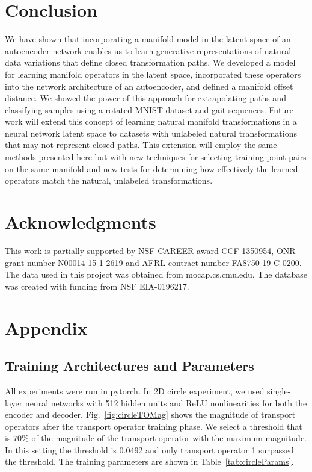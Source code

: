 \documentclass[letterpaper]{article} %
\begin{document}
\section{Conclusion}

We have shown that incorporating a manifold model in the latent space of an autoencoder network enables us to learn generative representations of natural data variations that define closed transformation paths. We developed a model for learning manifold operators in the latent space, incorporated these operators into the network architecture of an autoencoder, and defined a manifold offset distance. We showed the power of this approach for extrapolating paths and classifying samples using a rotated MNIST dataset and gait sequences. Future work will extend this concept of learning natural manifold transformations in a neural network latent space to datasets with unlabeled natural transformations that may not represent closed paths. This extension will employ the same methods presented here but with new techniques for selecting training point pairs on the same manifold and new tests for determining how effectively the learned operators match the natural, unlabeled transformations.

\section{ Acknowledgments}
This work is partially supported by NSF CAREER award CCF-1350954, ONR grant number N00014-15-1-2619 and AFRL contract number FA8750-19-C-0200. The data used in this project was obtained from mocap.cs.cmu.edu. The database was created with funding from NSF EIA-0196217.

\section{Appendix}
\label{sec:appendix}
\subsection{Training Architectures and Parameters}
\label{subsec:trainParam}
All experiments were run in pytorch. In 2D circle experiment, we used single-layer neural networks with 512 hidden units and ReLU nonlinearities for both the encoder and decoder. Fig.~\ref{fig:circleTOMag} shows the magnitude of transport operators after the transport operator training phase. We select a threshold that is $70\%$ of the magnitude of the transport operator with the maximum magnitude. In this setting the threshold is 0.0492 and only transport operator 1 surpassed the threshold. The training parameters are shown in Table~\ref{tab:circleParams}.
\end{document}
